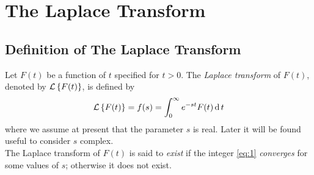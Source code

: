 \documentclass[../main-sheet.tex]{subfiles}
\begin{document}
\chapter{The Laplace Transform}
\section{Definition of The Laplace Transform}
Let $ F(t) $ be a function of $ t $ specified for $ t>0 $. The \emph{Laplace transform} of $ F(t) $, denoted by $ \mathcal{L}\left\{ F(t)\right\} $, is defined by
\begin{equation}
    \mathcal{L}\left\{ F(t)\right\}=f(s)=\int_0^\infty e^{-st}F(t)\,\mathrm{d}\, t \label{eq:1}
\end{equation}
where we assume at present that the parameter $ s $ is real. Later it will be found useful to consider $ s $ complex.\\

The Laplace transform of $ F(t) $ is said to \emph{exist} if the integer \eqref{eq:1} \emph{converges} for some values of $ s $; otherwise it does not exist.
\end{document}
